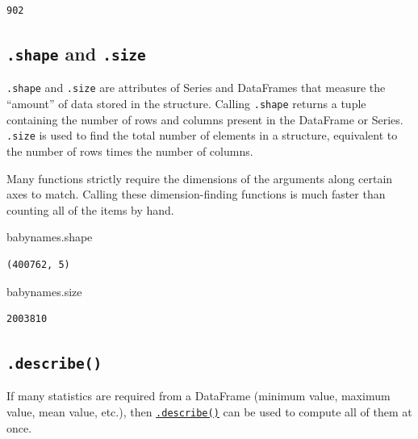 \documentclass[
  letterpaper,
  DIV=11,
  numbers=noendperiod]{scrreprt}
\newenvironment{Shaded}{\begin{snugshade}}{\end{snugshade}}
\newcommand{\NormalTok}[1]{\textcolor[rgb]{0.00,0.23,0.31}{#1}}
\begin{document}
\begin{verbatim}
902
\end{verbatim}

\hypertarget{shape-and-.size}{%
\subsection{\texorpdfstring{\texttt{.shape} and
\texttt{.size}}{.shape and .size}}\label{shape-and-.size}}

\texttt{.shape} and \texttt{.size} are attributes of Series and
DataFrames that measure the ``amount'' of data stored in the structure.
Calling \texttt{.shape} returns a tuple containing the number of rows
and columns present in the DataFrame or Series. \texttt{.size} is used
to find the total number of elements in a structure, equivalent to the
number of rows times the number of columns.

Many functions strictly require the dimensions of the arguments along
certain axes to match. Calling these dimension-finding functions is much
faster than counting all of the items by hand.

\begin{Shaded}
\begin{Highlighting}[]
\NormalTok{babynames.shape}
\end{Highlighting}
\end{Shaded}

\begin{verbatim}
(400762, 5)
\end{verbatim}

\begin{Shaded}
\begin{Highlighting}[]
\NormalTok{babynames.size}
\end{Highlighting}
\end{Shaded}

\begin{verbatim}
2003810
\end{verbatim}

\hypertarget{describe}{%
\subsection{\texorpdfstring{\texttt{.describe()}}{.describe()}}\label{describe}}

If many statistics are required from a DataFrame (minimum value, maximum
value, mean value, etc.), then
\href{https://pandas.pydata.org/docs/reference/api/pandas.DataFrame.describe.html}{\texttt{.describe()}}
can be used to compute all of them at once.
\end{document}
